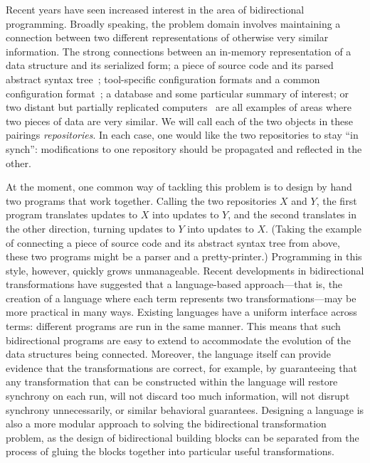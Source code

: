 Recent years have seen increased interest in the area of bidirectional
programming. Broadly speaking, the problem domain involves maintaining a
connection between two different representations of otherwise very similar
information. The strong connections between an in-memory representation of a
data structure and its serialized form; a piece of source code and its
parsed abstract syntax tree~\cite{rendel2010invertible}; tool-specific
configuration formats and a common configuration format~\cite{Augeas}; a
database and some particular summary of interest; or two distant but
partially replicated computers~\cite{pierce2004unison} are all examples of
areas where two pieces of data are very similar. We will call each of the
two objects in these pairings \emph{repositories}. In each case, one would
like the two repositories to stay ``in synch'': modifications to one
repository should be propagated and reflected in the other.

At the moment, one common way of tackling this problem is to design by hand
two programs that work together. Calling the two repositories $X$ and $Y$,
the first program translates updates to $X$ into updates to $Y$, and the
second translates in the other direction, turning updates to $Y$ into
updates to $X$. (Taking the example of connecting a piece of source code and
its abstract syntax tree from above, these two programs might be a parser
and a pretty-printer.) Programming in this style, however, quickly grows
unmanageable. Recent developments in bidirectional transformations have
suggested that a language-based approach---that is, the creation of a
language where each term represents two transformations---may be more
practical in many ways. Existing languages have a uniform interface across
terms: different programs are run in the same manner. This means that such
bidirectional programs are easy to extend to accommodate the evolution of
the data structures being connected. Moreover, the language itself can
provide evidence that the transformations are correct, for example, by
guaranteeing that any transformation that can be constructed within the
language will restore synchrony on each run, will not discard too much
information, will not disrupt synchrony unnecessarily, or similar behavioral
guarantees. Designing a language is also a more modular approach to solving
the bidirectional transformation problem, as the design of bidirectional
building blocks can be separated from the process of gluing the blocks
together into particular useful transformations.

